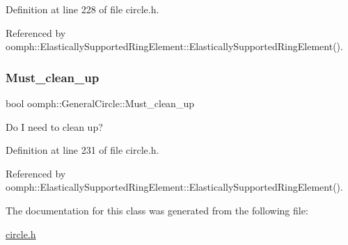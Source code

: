 Definition at line 228 of file circle.\+h.



Referenced by oomph\+::\+Elastically\+Supported\+Ring\+Element\+::\+Elastically\+Supported\+Ring\+Element().

\mbox{\label{classoomph_1_1GeneralCircle_a6772cb425079b3afd2479663ddb0cb81}} 
\subsubsection{\texorpdfstring{Must\+\_\+clean\+\_\+up}{Must\_clean\_up}}
{\footnotesize\ttfamily bool oomph\+::\+General\+Circle\+::\+Must\+\_\+clean\+\_\+up\hspace{0.3cm}{\ttfamily [protected]}}



Do I need to clean up? 



Definition at line 231 of file circle.\+h.



Referenced by oomph\+::\+Elastically\+Supported\+Ring\+Element\+::\+Elastically\+Supported\+Ring\+Element().



The documentation for this class was generated from the following file\+:\begin{DoxyCompactItemize}
\item 
\hyperlink{circle_8h}{circle.\+h}\end{DoxyCompactItemize}
